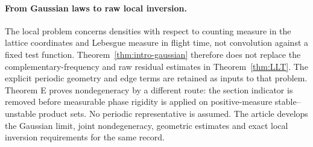 \documentclass[11pt,reqno]{amsart}
\numberwithin{equation}{section}
\theoremstyle{definition}\newtheorem{definition}[theorem]{Definition}
\theoremstyle{remark}\newtheorem{remark}[theorem]{Remark}
\begin{document}
\paragraph{From Gaussian laws to raw local inversion.}
The local problem concerns densities with respect to counting measure
in the lattice coordinates and Lebesgue measure in flight time, not
convolution against a fixed test function. Theorem~\ref{thm:intro-gaussian}
therefore does not replace the complementary-frequency and raw residual
estimates in Theorem~\ref{thm:LLT}. The explicit periodic geometry
and edge terms are retained as inputs to that problem. Theorem E proves
nondegeneracy by a different route: the section indicator is removed
before measurable phase rigidity is applied on positive-measure
stable--unstable product sets. No periodic representative is assumed.
The article develops the Gaussian limit, joint nondegeneracy, geometric
estimates and exact local inversion requirements for the same record.
\end{document}
